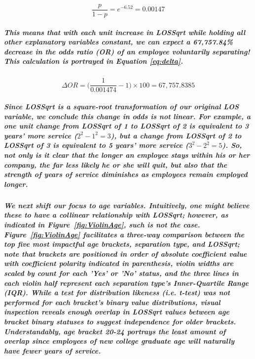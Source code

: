 \documentclass[10pt]{article}
\begin{document}
\begin{equation}
\dfrac{p}{1-p} = e^{-6.52} = 0.00147
\label{eq:exp}
\end{equation}

\subparagraph{This means that with each unit increase in LOSSqrt while holding all other explanatory variables constant, we can expect a 67,757.84\% decrease in the odds ratio (OR) of an employee voluntarily separating! This calculation is portrayed in Equation \ref{eq:delta}.}

\begin{equation}
\Delta OR = \Big(\dfrac{1}{0.001474} - 1\Big)\times100 = 67,757.8385
\label{eq:delta}
\end{equation}

\subparagraph{Since LOSSqrt is a square-root transformation of our original LOS variable, we conclude this change in odds is not linear. For example, a one unit change from LOSSqrt of 1 to LOSSqrt of 2 is equivalent to 3 years' more service ($2^2-1^2=3$), but a change from LOSSqrt of 2 to LOSSqrt of 3 is equivalent to 5 years' more service ($3^2-2^2=5$). So, not only is it clear that the longer an employee stays within his or her company, the far less likely he or she will quit, but also that the strength of years of service diminishes as employees remain employed longer.}

\subparagraph{We next shift our focus to age variables. Intuitively, one might believe these to have a collinear relationship with LOSSqrt; however, as indicated in Figure~\ref{fig:ViolinAge}, such is not the case. Figure~\ref{fig:ViolinAge} facilitates a three-way comparison between the top five most impactful age brackets, separation type, and LOSSqrt; note that brackets are positioned in order of absolute coefficient value with coefficient polarity indicated in parenthesis, violin widths are scaled by count for each 'Yes' or 'No' status, and the three lines in each violin half represent each separation type's Inner-Quartile Range (IQR). While a test for distribution likeness (i.e. t-test) was not performed for each bracket's binary value distributions, visual inspection reveals enough overlap in LOSSqrt values between age bracket binary statuses to suggest independence for older brackets. Understandably, age bracket 20-24 portrays the least amount of overlap since employees of new college graduate age will naturally have fewer years of service.}
\end{document}
